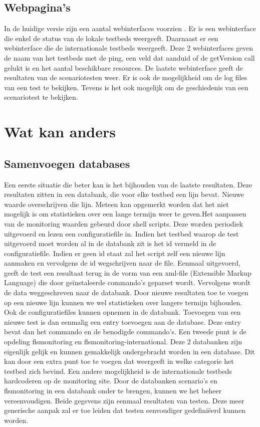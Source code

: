 \subsection{Webpagina\rq s}
\npar
In de huidige versie zijn een aantal webinterfaces voorzien\citep{FED4FIRE-doc} .
Er is een webinterface die enkel de status van de lokale testbeds weergeeft. Daarnaast er een webinterface die de internationale testbeds weergeeft. 
Deze 2 webinterfaces geven de naam van het testbeds met de ping, een veld dat aanduid of de getVersion call gelukt is en het aantal beschikbare resources.
\npar
De laatste webinterface geeft de resultaten van de scenariotesten weer. Er is ook de mogelijkheid om de log files van een test te bekijken. Tevens is het ook mogelijk om de geschiedenis van een scenariotest te bekijken.
\section{Wat kan anders}
\subsection{Samenvoegen databases}
\npar
Een eerste situatie die beter kan is het bijhouden van de laatste resultaten.
Deze resultaten zitten in een databank, die voor elke testbed een lijn bevat. Nieuwe waarde overschrijven die lijn. Meteen kan opgemerkt worden dat het niet mogelijk is om statistieken over een lange termijn weer te geven.Het aanpassen van de monitoring waarden gebeurd door shell scripts. Deze worden periodiek uitgevoerd en lezen een configuratiefile in. Indien het testbed waarop de test uitgevoerd moet worden al in de databank zit is het id vermeld in de configuratiefile. Indien er geen id staat zal het script zelf een nieuwe lijn aanmaken en vervolgens de id wegschrijven naar de file. Eenmaal uitgevoerd, geeft de test een resultaat terug in de vorm van een xml-file (Extensible Markup Language) die door ge\"instaleerde commando's geparset wordt. Vervolgens wordt de data weggeschreven naar de databank.
\npar
Door nieuwe resultaten toe te voegen op een nieuwe lijn kunnen we wel statistieken over langere termijn bijhouden.
Ook de configuratiefiles kunnen opnemen in de databank. Toevoegen van een nieuwe test is dan eenmalig een entry toevoegen aan de database.
Deze entry bevat dan het commando en de benodigde commando's.
\npar
Een tweede punt is de opdeling flsmonitoring en flsmonitoring-international. Deze 2 databanken zijn eigenlijk gelijk en kunnen gemakkelijk ondergebracht worden in een database.
Dit kan door een extra punt toe te voegen dat weergeeft in welke categorie het testbed zich bevind. Een andere mogelijkheid is de internationale testbeds hardcoderen op de monitoring site.
\npar
Door de databanken scenario's en flsmonitoring in een databank onder te brengen, kunnen we het beheer vereenvoudigen.
Beide gegevens zijn eenmaal resultaten van testen. Deze meer generische aanpak zal er toe leiden dat testen eenvoudiger gedefini\"eerd kunnen worden.

